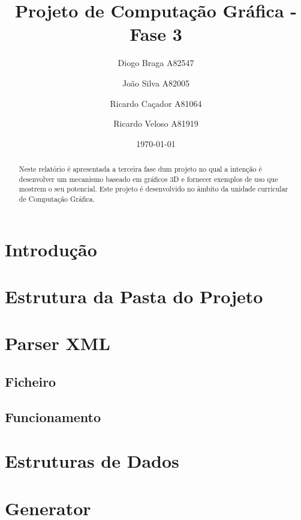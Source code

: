 \documentclass[a4paper]{article}
\title{Projeto de Computação Gráfica - Fase 3}
\author{Diogo Braga A82547 \and João Silva A82005 \and Ricardo Caçador A81064
\and Ricardo Veloso A81919}
\date{\today}
\begin{document}
\maketitle

\begin{abstract}
Neste relatório é apresentada a terceira fase dum projeto no qual a intenção é desenvolver um mecanismo baseado em gráficos 3D e fornecer exemplos de uso que mostrem o seu potencial. Este projeto é desenvolvido no âmbito da unidade curricular de Computação Gráfica.
\end{abstract}


\newpage

\tableofcontents


\newpage

\section{Introdução}
\label{sec:intro}



\section{Estrutura da Pasta do Projeto}
\label{sec:estrutura}



\section{Parser XML}
\label{sec:parser}

\subsection{Ficheiro}
\label{sec:ficheiro}

\subsection{Funcionamento}
\label{sec:funcionamento}



\section{Estruturas de Dados}
\label{sec:estruturasdados}



\section{Generator}
\label{sec:generator}
\end{document}
